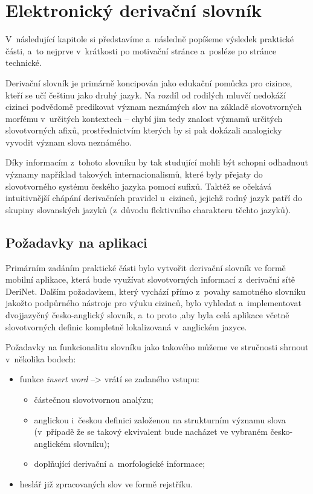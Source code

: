 \hypertarget{elektronickuxfd-derivaux10dnuxed-slovnuxedk}{%
\chapter{Elektronický derivační
slovník}\label{elektronickuxfd-derivaux10dnuxed-slovnuxedk}}

V~následující kapitole si představíme a~následně popíšeme výsledek
praktické části, a~to nejprve v~krátkosti po motivační stránce a~posléze
po stránce technické.

Derivační slovník je primárně koncipován jako edukační pomůcka pro
cizince, kteří se učí češtinu jako druhý jazyk. Na rozdíl od rodilých
mluvčí nedokáží cizinci podvědomě predikovat význam neznámých slov na
základě slovotvorných morfému v~určitých kontextech -- chybí jim tedy
znalost významů určitých slovotvorných afixů, prostřednictvím kterých by
si pak dokázali analogicky vyvodit význam slova neznámého.

Díky informacím z~tohoto slovníku by tak studující mohli být schopni
odhadnout významy například takových internacionalismů, které byly
přejaty do slovotvorného systému českého jazyka pomocí sufixů. Taktéž se
očekává intuitivnější chápání derivačních pravidel u~cizinců, jejichž
rodný jazyk patří do skupiny slovanských jazyků (z~důvodu flektivního
charakteru těchto jazyků).

\hypertarget{poux17eadavky-na-aplikaci}{%
\section{Požadavky na aplikaci}\label{poux17eadavky-na-aplikaci}}

Primárním zadáním praktické části bylo vytvořit derivační slovník ve
formě mobilní aplikace, která bude využívat slovotvorných informací
z~derivační sítě DeriNet. Dalším požadavkem, který vychází přímo z~povahy
samotného slovníku jakožto podpůrného nástroje pro výuku cizinců, bylo
vyhledat a~implementovat dvojjazyčný česko-anglický slovník, a~to proto
,aby byla celá aplikace včetně slovotvorných definic kompletně
lokalizovaná v~anglickém jazyce.

Požadavky na funkcionalitu slovníku jako takového můžeme ve stručnosti
shrnout v~několika bodech:

\begin{itemize}
\tightlist
\item
  funkce \emph{insert word} --\textgreater{} vrátí se zadaného vstupu:

  \begin{itemize}
  \tightlist
  \item
    částečnou slovotvornou analýzu;
  \item
    anglickou i~českou definici založenou na strukturním významu slova
    (v~případě že se takový ekvivalent bude nacházet ve vybraném
    česko-anglickém slovníku);
  \item
    doplňující derivační a~morfologické informace;
  \end{itemize}
\item
  heslář již zpracovaných slov ve formě rejstříku.
\end{itemize}

